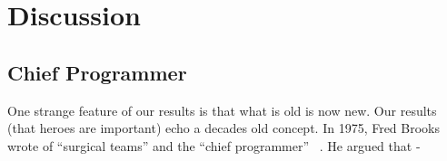 \documentclass[smallextended]{svjour3}
\begin{document}



\section{Discussion}
\label{sec:Discussion}

\subsection{Chief Programmer}
One strange feature of our results is that what is old is now new.   Our results (that heroes are important) echo a decades old concept. In 1975, Fred Brooks wrote of  ``surgical teams'' and the ``chief programmer'' ~\cite{brooks1974mythical}. He argued that - 
\end{document}
